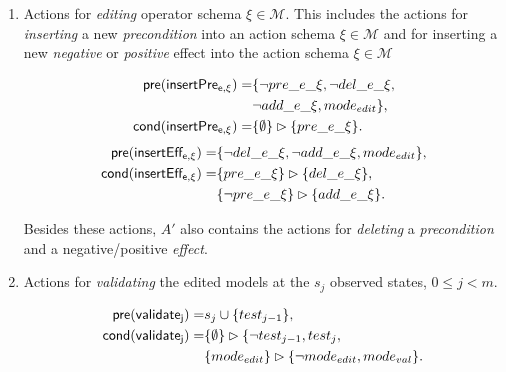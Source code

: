 \documentclass[letterpaper]{article} %
\newcommand{\pre}{\mathsf{pre}}     %
\newcommand{\cond}{\mathsf{cond}}   %
\begin{document}
\begin{itemize}
\begin{enumerate}
\item Actions for {\em editing} operator schema $\xi\in\mathcal{M}$. This includes the actions for {\em inserting} a new {\em precondition} into an action schema $\xi\in\mathcal{M}$ and for inserting a new {\em negative} or {\em positive} effect into the action schema $\xi\in\mathcal{M}$
\begin{small}
\begin{align*}
\hspace*{7pt}\pre(\mathsf{insertPre_{e,\xi}})=&\{\neg pre\_e\_\xi, \neg del\_e\_\xi,\\
& \neg add\_e\_\xi, mode_{edit}\},\\
\cond(\mathsf{insertPre_{e,\xi}})=&\{\emptyset\}\rhd\{pre\_e\_\xi\}.
\end{align*}
\begin{align*}
\hspace*{7pt}\pre(\mathsf{insertEff_{e,\xi}})=&\{\neg del\_e\_\xi, \neg add\_e\_\xi,mode_{edit}\},\\
\cond(\mathsf{insertEff_{e,\xi}})=&\{pre\_e\_\xi\}\rhd\{del\_e\_\xi\},\\
&\{\neg pre\_e\_\xi\}\rhd\{add\_e\_\xi\}.
\end{align*}
\end{small}
Besides these actions, $A'$ also contains the actions for {\em deleting} a {\em precondition} and a negative/positive {\em effect}.

\item Actions for {\em validating} the edited models at the $s_j$ observed states, {\tt\small $0\leq j< m$}.
\begin{small}
\begin{align*}
\hspace*{7pt}\pre(\mathsf{validate_{j}})=&s_j\cup\{test_{j-1}\},\\
\cond(\mathsf{validate_{j}})=&\{\emptyset\}\rhd\{\neg test_{j-1}, test_j,\\
                            &\{mode_{edit}\}\rhd\{\neg mode_{edit}, mode_{val}\}.
\end{align*}
\end{small}
\end{enumerate}
\end{itemize}
\end{document}
